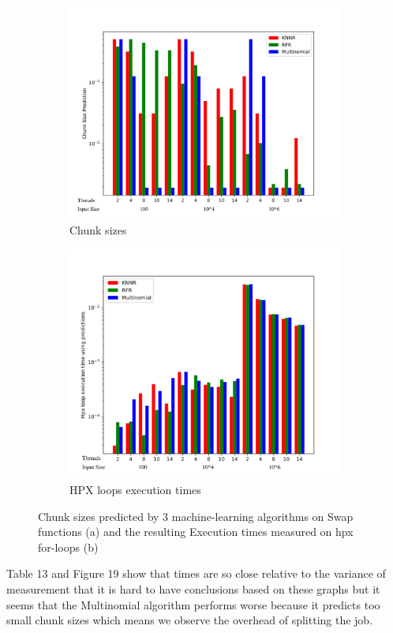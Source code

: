 \begin{figure}[h]
	\centering
	\begin{subfigure}[b]{0.5\textwidth}
		\centering
		\includegraphics[width=\textwidth]{images/bars_Swap_cs.pdf}
		\caption[Network2]%
		{{Chunk sizes}}    
	\end{subfigure}
	\hfill
	\begin{subfigure}[b]{0.49\textwidth}  
		\centering 
		\includegraphics[width=\textwidth]{images/bars_Swap_times.pdf}
		\caption[]%
		{{HPX loops execution times}}    
	\end{subfigure}
	\caption{Chunk sizes predicted by 3 machine-learning algorithms on Swap functions (a) and the resulting Execution times measured on hpx for-loops (b)} 
\end{figure}
Table 13 and Figure 19 show that times are so close relative to the variance of measurement that it is hard to have conclusions based on these graphs but it seems that the Multinomial algorithm performs worse because it predicts too small chunk sizes which means we observe the overhead of splitting the job.
\newpage
